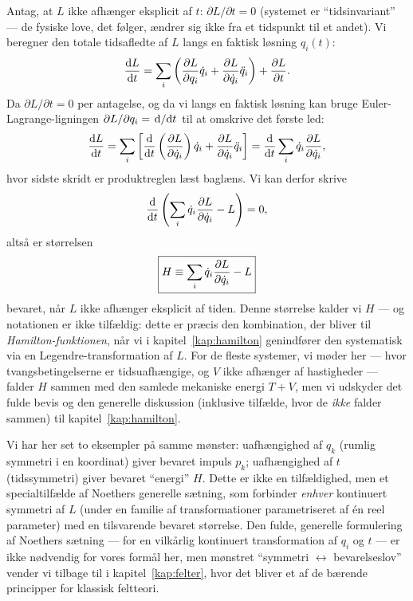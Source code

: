 Antag, at $L$ ikke afhænger eksplicit af $t$: $\partial L/\partial t=0$
(systemet er ``tidsinvariant'' — de fysiske love, det følger, ændrer sig
ikke fra et tidspunkt til et andet). Vi beregner den totale tidsafledte
af $L$ langs en faktisk løsning $q_i(t)$:
\begin{equation}
  \dv{L}{t} = \sum_i\left(\pdv{L}{q_i}\dot q_i + \pdv{L}{\dot q_i}\ddot q_i\right) + \pdv{L}{t}.
\end{equation}
Da $\partial L/\partial t=0$ per antagelse, og da vi langs en faktisk
løsning kan bruge Euler-Lagrange-ligningen
$\partial L/\partial q_i = \dv*{}{t}(\partial L/\partial \dot q_i)$ til
at omskrive det første led:
\begin{equation}
  \dv{L}{t} = \sum_i\left[\dv{}{t}\left(\pdv{L}{\dot q_i}\right)\dot q_i + \pdv{L}{\dot q_i}\ddot q_i\right]
  = \dv{}{t}\sum_i \dot q_i\pdv{L}{\dot q_i},
\end{equation}
hvor sidste skridt er produktreglen læst baglæns. Vi kan derfor skrive
\begin{equation}
  \dv{}{t}\left(\sum_i \dot q_i\pdv{L}{\dot q_i} - L\right) = 0,
\end{equation}
altså er størrelsen
\begin{equation}
  \boxed{H \equiv \sum_i \dot q_i\pdv{L}{\dot q_i} - L}
  \label{eq:def-H-forlobig}
\end{equation}
bevaret, når $L$ ikke afhænger eksplicit af tiden. Denne størrelse
kalder vi $H$ — og notationen er ikke tilfældig: dette er præcis den
kombination, der bliver til \emph{Hamilton-funktionen}, når vi i
kapitel~\ref{kap:hamilton} genindfører den systematisk via en
Legendre-transformation af $L$. For de fleste systemer, vi møder her —
hvor tvangsbetingelserne er tidsuafhængige, og $V$ ikke afhænger af
hastigheder — falder $H$ sammen med den samlede mekaniske energi
$T+V$, men vi udskyder det fulde bevis og den generelle diskussion
(inklusive tilfælde, hvor de \emph{ikke} falder sammen) til
kapitel~\ref{kap:hamilton}.

\begin{bemaerkning}
Vi har her set to eksempler på samme mønster: uafhængighed af $q_k$
(rumlig symmetri i en koordinat) giver bevaret impuls $p_k$;
uafhængighed af $t$ (tidssymmetri) giver bevaret ``energi'' $H$. Dette er
ikke en tilfældighed, men et specialtilfælde af Noethers generelle
sætning, som forbinder \emph{enhver} kontinuert symmetri af $L$ (under
en familie af transformationer parametriseret af én reel parameter)
med en tilsvarende bevaret størrelse. Den fulde, generelle formulering
af Noethers sætning — for en vilkårlig kontinuert transformation af
$q_i$ og $t$ — er ikke nødvendig for vores formål her, men mønstret
``symmetri $\leftrightarrow$ bevarelseslov'' vender vi tilbage til i
kapitel~\ref{kap:felter}, hvor det bliver et af de bærende principper
for klassisk feltteori.
\end{bemaerkning}

